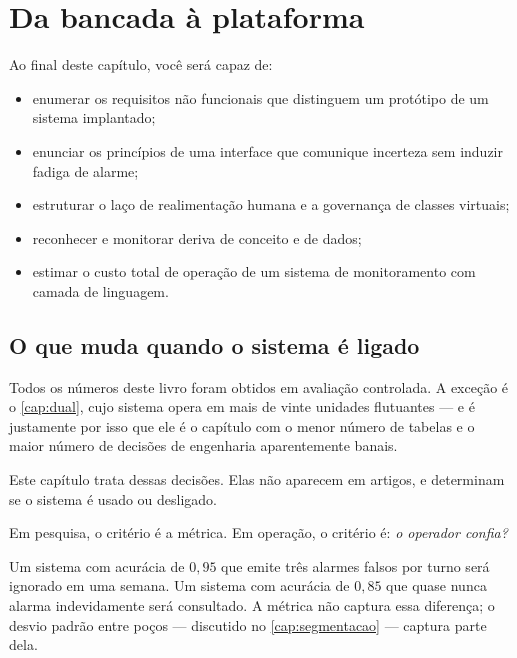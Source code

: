 \chapter{Da bancada à plataforma}
\label{cap:operacao}

\begin{objetivos}
Ao final deste capítulo, você será capaz de:
\begin{itemize}[leftmargin=*,itemsep=0.2em]
  \item enumerar os requisitos não funcionais que distinguem um protótipo de um sistema
        implantado;
  \item enunciar os princípios de uma interface que comunique incerteza sem induzir
        fadiga de alarme;
  \item estruturar o laço de realimentação humana e a governança de classes virtuais;
  \item reconhecer e monitorar deriva de conceito e de dados;
  \item estimar o custo total de operação de um sistema de monitoramento com camada de
        linguagem.
\end{itemize}
\end{objetivos}

\section{O que muda quando o sistema é ligado}

Todos os números deste livro foram obtidos em avaliação controlada. A exceção é o
\cref{cap:dual}, cujo sistema opera em mais de vinte unidades flutuantes --- e é
justamente por isso que ele é o capítulo com o menor número de tabelas e o maior número
de decisões de engenharia aparentemente banais.

Este capítulo trata dessas decisões. Elas não aparecem em artigos, e determinam se o
sistema é usado ou desligado.

\begin{destaque}
Em pesquisa, o critério é a métrica. Em operação, o critério é: \emph{o operador confia?}

Um sistema com acurácia de $0{,}95$ que emite três alarmes falsos por turno será
ignorado em uma semana. Um sistema com acurácia de $0{,}85$ que quase nunca alarma
indevidamente será consultado. A métrica não captura essa diferença; o desvio padrão
entre poços --- discutido no \cref{cap:segmentacao} --- captura parte dela.
\end{destaque}

